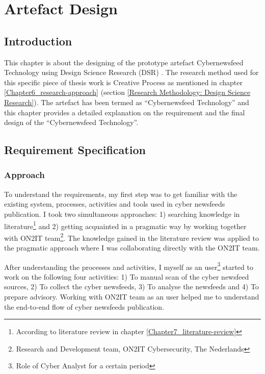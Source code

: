 
\chapter{Artefact Design} %

\label{Chapter8_artefact-design} %

\section{Introduction }
This chapter is about the designing of the prototype artefact Cybernewsfeed Technology using Design Science Research (DSR) 
\citep{hevner2010design}. 
The research method used for this specific piece of thesis work is Creative Process 
\citep{march1995design}  
as mentioned in chapter  
\ref{Chapter6_research-approach} 
(section \ref{Research Methodology: Design Science Research}). The artefact  has been termed as \enquote{Cybernewsfeed Technology} and this chapter provides a detailed explanation on the requirement and the final design of the \enquote{Cybernewsfeed Technology}.

\section{Requirement Specification}
%

\subsection{Approach}

 To understand the requirements, my first step was to get familiar with the existing system, processes, activities and tools used in cyber newsfeeds publication. I took two simultaneous approaches: 1) searching knowledge in literature\footnote{According to literature review in chapter \ref{Chapter7_literature-review} } and 2) getting acquainted in a pragmatic way by working together with ON2IT team\footnote{Research and Development team, ON2IT Cybersecurity, The Nederlands}. The knowledge gained in the literature review was applied to the pragmatic approach where I was collaborating directly with the ON2IT team.
 
After understanding the processes and activities, I myself as an user\footnote{Role of Cyber Analyst for a certain period} started to work on the following four activities: 1) To manual scan of the cyber newsfeed sources,  2) To collect the cyber newsfeeds, 3) To analyse the newsfeeds and 4) To prepare advisory. Working with ON2IT team as an user helped me to understand the end-to-end flow of cyber newsfeeds publication.

